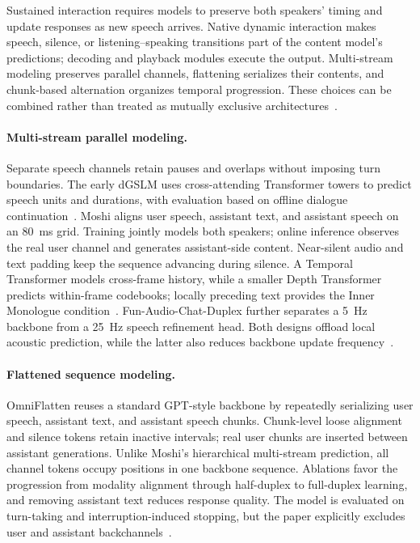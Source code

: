 
Sustained interaction requires models to preserve both speakers' timing and update responses as new speech arrives. Native dynamic interaction makes speech, silence, or listening--speaking transitions part of the content model's predictions; decoding and playback modules execute the output. Multi-stream modeling preserves parallel channels, flattening serializes their contents, and chunk-based alternation organizes temporal progression. These choices can be combined rather than treated as mutually exclusive architectures~\citep{DBLP:journals/corr/abs-2410-00037,DBLP:conf/acl/ZhangCDCWZLYTDZ25,DBLP:conf/emnlp/VeluriPYGG24}.

\paragraph{Multi-stream parallel modeling.}
Separate speech channels retain pauses and overlaps without imposing turn boundaries. The early dGSLM uses cross-attending Transformer towers to predict speech units and durations, with evaluation based on offline dialogue continuation~\citep{DBLP:journals/tacl/NguyenKCAHETASM23}. Moshi aligns user speech, assistant text, and assistant speech on an 80~ms grid. Training jointly models both speakers; online inference observes the real user channel and generates assistant-side content. Near-silent audio and text padding keep the sequence advancing during silence. A Temporal Transformer models cross-frame history, while a smaller Depth Transformer predicts within-frame codebooks; locally preceding text provides the Inner Monologue condition~\citep{DBLP:journals/corr/abs-2410-00037}. Fun-Audio-Chat-Duplex further separates a 5~Hz backbone from a 25~Hz speech refinement head. Both designs offload local acoustic prediction, while the latter also reduces backbone update frequency~\citep{DBLP:journals/corr/abs-2512-20156}.

\paragraph{Flattened sequence modeling.}
OmniFlatten reuses a standard GPT-style backbone by repeatedly serializing user speech, assistant text, and assistant speech chunks. Chunk-level loose alignment and silence tokens retain inactive intervals; real user chunks are inserted between assistant generations. Unlike Moshi's hierarchical multi-stream prediction, all channel tokens occupy positions in one backbone sequence. Ablations favor the progression from modality alignment through half-duplex to full-duplex learning, and removing assistant text reduces response quality. The model is evaluated on turn-taking and interruption-induced stopping, but the paper explicitly excludes user and assistant backchannels~\citep{DBLP:conf/acl/ZhangCDCWZLYTDZ25}.

